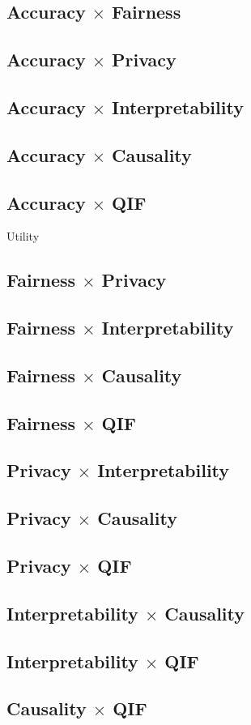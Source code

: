 \subsection{Accuracy $\times$ Fairness}

\subsection{Accuracy $\times$ Privacy}

\subsection{Accuracy $\times$ Interpretability}

\subsection{Accuracy $\times$ Causality}

\subsection{Accuracy $\times$ QIF}

Utility

\subsection{Fairness $\times$ Privacy}

\subsection{Fairness $\times$ Interpretability}

\subsection{Fairness $\times$ Causality}

\subsection{Fairness $\times$ QIF}

\subsection{Privacy $\times$ Interpretability}

\subsection{Privacy $\times$ Causality}

\subsection{Privacy $\times$ QIF}

\subsection{Interpretability $\times$ Causality}

\subsection{Interpretability $\times$ QIF}

\subsection{Causality $\times$ QIF}

